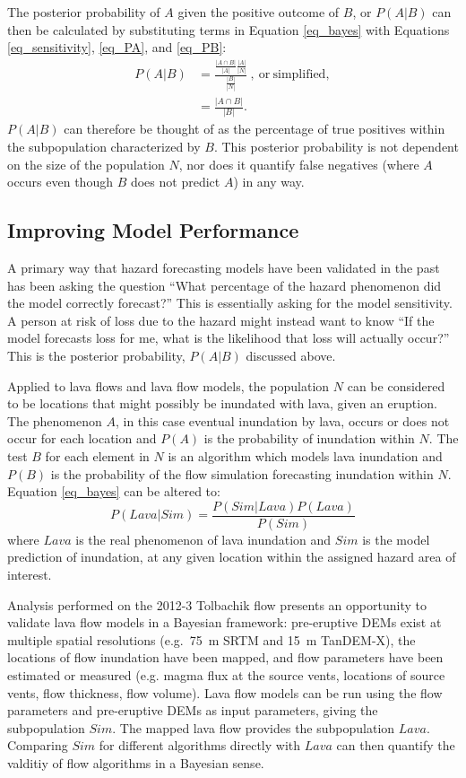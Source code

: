 \documentclass[12pt,letter]{article}
\begin{document}
		The posterior probability of $A$ given the positive outcome of $B$, or $P(A|B)$ can then be calculated by substituting terms in Equation \ref{eq_bayes} with Equations \ref{eq_sensitivity}, \ref{eq_PA}, and \ref{eq_PB}:
		\begin{align}
		P(A|B)&=\frac{\frac{|A\cap B|}{|A|}\frac{|A|}{|N|}}{\frac{|B|}{|N|}}~\mathrm{,~or~simplified,}\label{eq_unsimplepost}\\
		&=\frac{|A\cap B|}{|B|}.\label{eq_simplepost}
		\end{align}
		$P(A|B)$ can therefore be thought of as the percentage of true positives within the subpopulation characterized by $B$. This posterior probability is not dependent on the size of the population $N$, nor does it quantify false negatives (where $A$ occurs even though $B$ does not predict $A$) in any way.

	\subsection{Improving Model Performance}\label{sec:lava_app}
		A primary way that hazard forecasting models have been validated in the past has been asking the question ``What percentage of the hazard phenomenon did the model correctly forecast?'' This is essentially asking for the model sensitivity. A person at risk of loss due to the hazard might instead want to know ``If the model forecasts loss for me, what is the likelihood that loss will actually occur?'' This is the posterior probability, $P(A|B)$ discussed above.

		Applied to lava flows and lava flow models, the population $N$ can be considered to be locations that might possibly be inundated with lava, given an eruption. The phenomenon $A$, in this case eventual inundation by lava, occurs or does not occur for each location and $P(A)$ is the probability of inundation within $N$. The test $B$ for each element in $N$ is an algorithm which models lava inundation and $P(B)$ is the probability of the flow simulation forecasting inundation within $N$. Equation \ref{eq_bayes} can be altered to:
		\begin{equation}
		P(Lava|Sim)=\frac{P(Sim|Lava)P(Lava)}{P(Sim)}\label{eq_lavabayes}
		\end{equation}
		where $Lava$ is the real phenomenon of lava inundation and $Sim$ is the model prediction of inundation, at any given location within the assigned hazard area of interest.

		Analysis performed on the 2012-3 Tolbachik flow presents an opportunity to validate lava flow models in a Bayesian framework: pre-eruptive DEMs exist at multiple spatial resolutions (e.g.~75~m SRTM and 15~m TanDEM-X), the locations of flow inundation have been mapped, and flow parameters have been estimated or measured (e.g. magma flux at the source vents, locations of source vents, flow thickness, flow volume). Lava flow models can be run using the flow parameters and pre-eruptive DEMs as input parameters, giving the subpopulation $Sim$. The mapped lava flow provides the subpopulation $Lava$. Comparing $Sim$ for different algorithms directly with $Lava$ can then quantify the valditiy of flow algorithms in a Bayesian sense.
\end{document}
